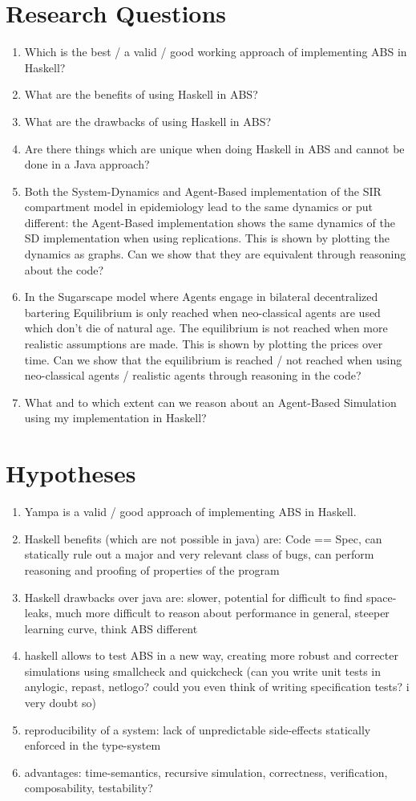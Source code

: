 \section{Research Questions}
\begin{enumerate}
	\item Which is the best / a valid / good working approach of implementing ABS in Haskell?
	\item What are the benefits of using Haskell in ABS?
	\item What are the drawbacks of using Haskell in ABS?
	\item Are there things which are unique when doing Haskell in ABS and cannot be done in a Java approach?
	\item Both the System-Dynamics and Agent-Based implementation of the SIR compartment model in epidemiology lead to the same dynamics or put different: the Agent-Based implementation shows the same dynamics of the SD implementation when using replications. This is shown by plotting the dynamics as graphs. Can we show that they are equivalent through reasoning about the code?
	\item In the Sugarscape model where Agents engage in bilateral decentralized bartering Equilibrium is only reached when neo-classical agents are used which don't die of natural age. The equilibrium is not reached when more realistic assumptions are made. This is shown by plotting the prices over time. Can we show that the equilibrium is reached / not reached when using neo-classical agents / realistic agents through reasoning in the code?
	\item What and to which extent can we reason about an Agent-Based Simulation using my implementation in Haskell?
\end{enumerate}

\section{Hypotheses}
\begin{enumerate}
	\item Yampa is a valid / good approach of implementing ABS in Haskell.
	\item Haskell benefits (which are not possible in java) are: Code == Spec, can statically rule out a major and very relevant class of bugs, can perform reasoning and proofing of properties of the program
	\item Haskell drawbacks over java are: slower, potential for difficult to find space-leaks, much more difficult to reason about performance in general, steeper learning curve, think ABS different 
	\item haskell allows to test ABS in a new way, creating more robust and correcter simulations using smallcheck and quickcheck (can you write unit tests in anylogic, repast, netlogo? could you even think of writing specification tests? i very doubt so)
	\item reproducibility of a system: lack of unpredictable side-effects statically enforced in the type-system
	\item advantages: time-semantics, recursive simulation, correctness, verification, composability, testability?
\end{enumerate}